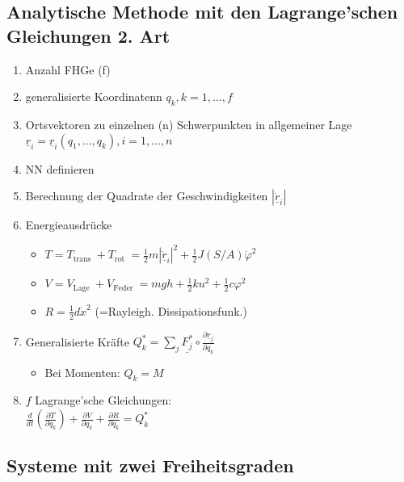\documentclass[fleqn,twoside]{article}
\newcommand{\abs}[1]{\ensuremath{\left\vert#1\right\vert}}
\begin{document}
\begin{multicols*}{3}
\subsection{Analytische Methode mit den Lagrange'schen Gleichungen 2. Art}
\begin{enumerate}
    \item Anzahl FHGe (f)
\item generalisierte Koordinatenn $q_k, k=1, \ldots, f$
\item Ortsvektoren zu einzelnen (n) Schwerpunkten in allgemeiner Lage $\underline{r}_i=\underline{r}_i\left(q_1, \ldots, q_k\right), i=1, \ldots, n$
\item NN definieren
\item Berechnung der Quadrate der Geschwindigkeiten $\abs{\dot{\underline{r}}_i}$
\item Energieausdrücke
\begin{itemize}
            \item $T=T_{\text {trans }}+T_{\text {rot }}=\frac{1}{2} m  \abs{\dot{\underline{r}}_i} ^2+\frac{1}{2} J(S / A) \dot{\varphi}^2$
            \item $V=V_{\text {Lage }}+V_{\text {Feder }}=m g h+\frac{1}{2} k u^2+\frac{1}{2} c \varphi^2$
            \item $R= \frac{1}{2} d \Dot{x}^2$ (=Rayleigh. Dissipationsfunk.)
\end{itemize}
\item Generalisierte Kräfte $Q_k^*=\sum_j \underline{F_j^*} \circ \frac{\partial \underline{r}_j}{\partial q_k}$
\begin{itemize}
            \item Bei Momenten: $Q_k=M$
\end{itemize}
\item $f$ Lagrange'sche Gleichungen: \\ $\frac{d}{d t}\left(\frac{\partial T}{\partial \Dot{q}_k}\right)+\frac{\partial V}{\partial q_k} + \frac{\partial R}{\partial \Dot{q}_k}=Q_k^*$
\end{enumerate}


\subsection{Systeme mit zwei Freiheitsgraden}

\begin{itemize}
    

\end{itemize}
\end{multicols*}
\end{document}
